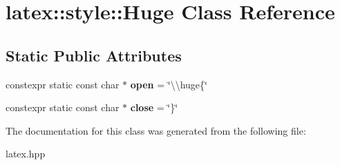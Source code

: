 \hypertarget{classlatex_1_1style_1_1Huge}{\section{latex\-:\-:style\-:\-:Huge Class Reference}
\label{classlatex_1_1style_1_1Huge}
}
\subsection*{Static Public Attributes}
\begin{DoxyCompactItemize}
\item 
\hypertarget{classlatex_1_1style_1_1Huge_aa51fea893411808973c2c0699b91cb23}{constexpr static const char $\ast$ {\bfseries open} = \char`\"{}\textbackslash{}\textbackslash{}huge\{\char`\"{}}\label{classlatex_1_1style_1_1Huge_aa51fea893411808973c2c0699b91cb23}

\item 
\hypertarget{classlatex_1_1style_1_1Huge_ad9abb5e698a0e3cfaeac3534a0376dc6}{constexpr static const char $\ast$ {\bfseries close} = \char`\"{}\}\char`\"{}}\label{classlatex_1_1style_1_1Huge_ad9abb5e698a0e3cfaeac3534a0376dc6}

\end{DoxyCompactItemize}


The documentation for this class was generated from the following file\-:\begin{DoxyCompactItemize}
\item 
latex.\-hpp\end{DoxyCompactItemize}
